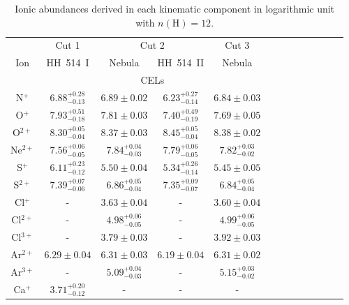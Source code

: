 \documentclass[fleqn,usenatbib]{mnras}
\begin{document}
\begin{table}
\centering
\caption{Ionic abundances derived in each kinematic component in logarithmic unit with $n(\text{H})=12$.}
\label{tab:ionic_abundances}
\begin{tabular}{ccccccccccccc}
\hline
 & \multicolumn{1}{c}{Cut 1} & \multicolumn{2}{c}{Cut 2} & \multicolumn{1}{c}{Cut 3} & \\
Ion &  HH~514~I & Nebula & HH~514~II  & Nebula \\
\hline
 & \multicolumn{4}{c}{CELs}\\

N$^{+}$  & $6.88^{+0.28} _{-0.13}$ &$6.89 \pm 0.02 $  & $6.23^{+0.27} _{-0.14}$& $6.84 \pm 0.03 $\\

O$^{+}$ & $7.93^{+0.51} _{-0.18}$ & $7.81 \pm 0.03 $&$7.40^{+0.49} _{-0.19}$ & $7.69 \pm 0.05 $\\ 

O$^{2+}$ & $8.30^{+0.05} _{-0.04}$& $8.37 \pm 0.03$& $8.45^{+0.05} _{-0.04}$ &$8.38 \pm 0.02 $\\

Ne$^{2+}$ & $7.56^{+0.06} _{-0.05}$& $7.84^{+0.04} _{-0.03}$ & $7.79^{+0.06} _{-0.05}$&$7.82^{+0.03} _{-0.02}$\\

S$^{+}$ & $6.11^{+0.23} _{-0.12}$ & $5.50 \pm 0.04 $& $5.34^{+0.26} _{-0.14}$&$5.45 \pm 0.05 $\\

S$^{2+}$ & $7.39^{+0.07} _{-0.06}$ &$6.86^{+0.05} _{-0.04}$ & $7.35^{+0.09} _{-0.07}$&$6.84^{+0.05} _{-0.04}$\\

Cl$^{+}$ & - &$3.63 \pm 0.04 $&- &$3.60 \pm 0.04 $\\

Cl$^{2+}$ &- &$4.98^{+0.06} _{-0.05}$&- &$4.99^{+0.06} _{-0.05}$\\

Cl$^{3+}$ & - &$3.79 \pm 0.03 $&- &$3.92 \pm 0.03 $\\

Ar$^{2+}$ & $6.29 \pm 0.04 $& $6.31 \pm 0.03 $& $6.19 \pm 0.04 $&$6.31 \pm 0.02 $\\

Ar$^{3+}$ & - &$5.09^{+0.04} _{-0.03}$& -&$5.15^{+0.03} _{-0.02}$\\

Ca$^{+}$ & $3.71^{+0.20} _{-0.12}$ &- &-&-\\


\end{tabular}
\end{table}
\end{document}
